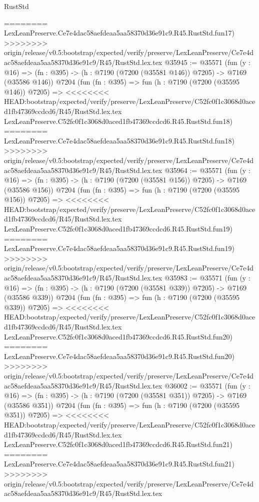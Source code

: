 \begin{lexlean}{RustStd}
\begin{coremodule}
{\begin{coremodule}
{{{{{{{{{{{{{{{{{{{{{{{{{{{{{{{{========
    LexLeanPreserve.Ce7e4dac58aefdeaa5aa58370d36e91c9.R45.RustStd.fun17)
>>>>>>>> origin/release/v0.5:bootstrap/expected/verify/preserve/LexLeanPreserve/Ce7e4dac58aefdeaa5aa58370d36e91c9/R45/RustStd.lex.tex
@35945 := @35571
    (fun (y : @16) => (fn : @395) -> (h : @7190 (@7200 (@35581 @146)) @7205) -> @7169 (@35586 @146))
    @7204
    (fun (fn : @395) =>
    fun (h : @7190 (@7200 (@35595 @146)) @7205) =>
<<<<<<<< HEAD:bootstrap/expected/verify/preserve/LexLeanPreserve/C52fc0f1c3068d0aced1fb47369ccdcd6/R45/RustStd.lex.tex
    LexLeanPreserve.C52fc0f1c3068d0aced1fb47369ccdcd6.R45.RustStd.fun18)
========
    LexLeanPreserve.Ce7e4dac58aefdeaa5aa58370d36e91c9.R45.RustStd.fun18)
>>>>>>>> origin/release/v0.5:bootstrap/expected/verify/preserve/LexLeanPreserve/Ce7e4dac58aefdeaa5aa58370d36e91c9/R45/RustStd.lex.tex
@35964 := @35571
    (fun (y : @16) => (fn : @395) -> (h : @7190 (@7200 (@35581 @156)) @7205) -> @7169 (@35586 @156))
    @7204
    (fun (fn : @395) =>
    fun (h : @7190 (@7200 (@35595 @156)) @7205) =>
<<<<<<<< HEAD:bootstrap/expected/verify/preserve/LexLeanPreserve/C52fc0f1c3068d0aced1fb47369ccdcd6/R45/RustStd.lex.tex
    LexLeanPreserve.C52fc0f1c3068d0aced1fb47369ccdcd6.R45.RustStd.fun19)
========
    LexLeanPreserve.Ce7e4dac58aefdeaa5aa58370d36e91c9.R45.RustStd.fun19)
>>>>>>>> origin/release/v0.5:bootstrap/expected/verify/preserve/LexLeanPreserve/Ce7e4dac58aefdeaa5aa58370d36e91c9/R45/RustStd.lex.tex
@35983 := @35571
    (fun (y : @16) => (fn : @395) -> (h : @7190 (@7200 (@35581 @339)) @7205) -> @7169 (@35586 @339))
    @7204
    (fun (fn : @395) =>
    fun (h : @7190 (@7200 (@35595 @339)) @7205) =>
<<<<<<<< HEAD:bootstrap/expected/verify/preserve/LexLeanPreserve/C52fc0f1c3068d0aced1fb47369ccdcd6/R45/RustStd.lex.tex
    LexLeanPreserve.C52fc0f1c3068d0aced1fb47369ccdcd6.R45.RustStd.fun20)
========
    LexLeanPreserve.Ce7e4dac58aefdeaa5aa58370d36e91c9.R45.RustStd.fun20)
>>>>>>>> origin/release/v0.5:bootstrap/expected/verify/preserve/LexLeanPreserve/Ce7e4dac58aefdeaa5aa58370d36e91c9/R45/RustStd.lex.tex
@36002 := @35571
    (fun (y : @16) => (fn : @395) -> (h : @7190 (@7200 (@35581 @351)) @7205) -> @7169 (@35586 @351))
    @7204
    (fun (fn : @395) =>
    fun (h : @7190 (@7200 (@35595 @351)) @7205) =>
<<<<<<<< HEAD:bootstrap/expected/verify/preserve/LexLeanPreserve/C52fc0f1c3068d0aced1fb47369ccdcd6/R45/RustStd.lex.tex
    LexLeanPreserve.C52fc0f1c3068d0aced1fb47369ccdcd6.R45.RustStd.fun21)
========
    LexLeanPreserve.Ce7e4dac58aefdeaa5aa58370d36e91c9.R45.RustStd.fun21)
>>>>>>>> origin/release/v0.5:bootstrap/expected/verify/preserve/LexLeanPreserve/Ce7e4dac58aefdeaa5aa58370d36e91c9/R45/RustStd.lex.tex
}}}}}}}}}}}}}}}}}}}}}}}}}}}}}}}}
\end{coremodule}}
\end{coremodule}
\end{lexlean}
